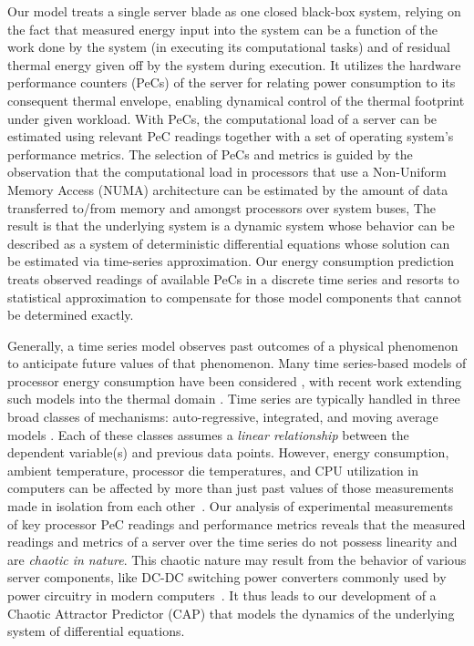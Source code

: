 \documentclass[acmtaco]{acmtrans2m}
\begin{document}
Our model treats a single server blade as one closed black-box system,
relying on the fact that measured energy input into the system can be a
function of the work done by the system (in executing its computational
tasks) and of residual thermal energy given off by the system during
execution.  It utilizes the hardware performance counters (PeCs) of the
server for relating power consumption to its consequent thermal
envelope, enabling dynamical control of the thermal footprint under
given workload.  With PeCs, the computational load of a server can be
estimated using relevant PeC readings together with a set of operating
system's performance metrics. The selection of PeCs and metrics is
guided by the observation that the computational load in processors that
use a Non-Uniform Memory Access (NUMA) architecture can be estimated by
the amount of data transferred to/from memory and amongst processors
over system buses, The result is that the underlying system is a dynamic
system whose behavior can be described as a system of deterministic
differential equations whose solution can be estimated via time-series
approximation. Our energy consumption prediction treats observed
readings of available PeCs in a discrete time series and resorts to
statistical approximation to compensate for those model components that
cannot be determined exactly.

Generally, a time series model observes past outcomes of a
physical phenomenon to anticipate future values of that
phenomenon.  Many time series-based models of processor energy
consumption have been considered
\cite{Rivoire2008a,Bhattacharjee2009,Powell2009,Reich2010,Bircher2011},
with recent work extending such models into the thermal domain
\cite{Coskun2008}.  Time series are typically handled in three broad
classes of mechanisms: auto-regressive, integrated, and moving average
models \cite{Box1994}.  Each of these classes assumes a \textit{linear
relationship} between the dependent variable(s) and previous data
points. However, energy consumption, ambient temperature, processor die
temperatures, and CPU utilization in computers can be affected by more
than just past values of those measurements made in isolation from each
other~\cite{Bertran2010,McCullough2011}.  Our analysis of experimental
measurements of key processor PeC readings and performance metrics
reveals that the measured readings and metrics of a server over the time
series do not possess linearity and are \textit{chaotic in nature}.
This chaotic nature may result from the behavior of various server components,
like DC-DC switching power converters commonly used by power circuitry in modern
computers~\cite{Hamill1997,Tse2002}.
It thus leads to our development of a Chaotic Attractor Predictor (CAP)
that models the dynamics of the underlying system of differential equations.
\end{document}
